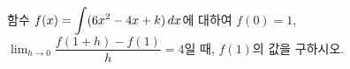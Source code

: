 함수 $f(x)=\displaystyle\int (6x^2-4x+k)\mkern3mu dx$에 대하여 $f(0)=1$, $\displaystyle\lim_{h\to 0}\dfrac{f(1+h)-f(1)}{h}=4$일 때, $f(1)$의 값을 구하시오. 
